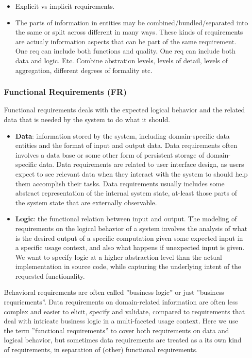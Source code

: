 \begin{itemize}
  \item Explicit vs implicit requirements.
  \item The parts of information in entities may be combined/bundled/separated into the same or split across different in many ways. These kinds of requirements are actualy information aspects that can be part of the same requirement. One req can include both functions and quality. One req can include both data and logic. Etc. Combine abstration levels, levels of detail, levels of aggregation, different degrees of formality etc.
\end{itemize}


\subsubsection{Functional Requirements (FR)}
Functional requirements deals with the expected logical behavior and the related data that is needed by the system to do what it should.
\begin{itemize}
  \item \textbf{Data}: information stored by the system, including domain-specific data entities and the format of input and output data. Data requirements often involves a data base or some other form of persistent storage of domain-specific data. Data requirements are related to user interface design, as users expect to see relevant data when they interact with the system to should help them accomplish their tasks. Data requirements usually includes some abstract representation of the internal system state, at-least those parts of the system state that are externally observable.
  \item \textbf{Logic}: the functional relation between input and output. The modeling of requirements on the logical behavior of a system involves the analysis of what is the desired output of a specific computation given some expected input in a specific usage context, and also what happens if unexpected input is given. We want to specify logic at a higher abstraction level than the actual implementation in source code, while capturing the underlying intent of the requested functionality. 
\end{itemize}

Behavioral requirements are often called ''business logic'' or just ''business requriements''. Data requirements on domain-related information are often less complex and easier to elicit, specify and validate, compared to requirements that deal with intricate business logic in a multi-faceted usage context. Here we use the term ''functional requirements'' to cover both requirements on data and logical behavior, but sometimes data requirements are treated as a its own kind of requirements, in separation of (other) functional requirements. 

